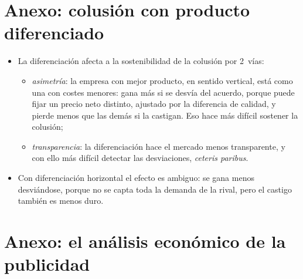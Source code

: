 \documentclass[11pt]{article}
\begin{document}
\section{Anexo: colusión con producto diferenciado}\label{anexo:colusion}

\begin{itemize}
\item La diferenciación afecta a la sostenibilidad de la colusión  por 2~vías\nocite{IvaldiEtAl2003Tacit}:
  \begin{itemize}
  \item \emph{asimetría}: la empresa con mejor producto, en sentido vertical, está como una con costes menores: gana más si se desvía del acuerdo, porque puede fijar un precio neto distinto, ajustado por la diferencia de calidad, y pierde menos que las demás si la castigan. Eso hace más difícil sostener la colusión;
  \item \emph{transparencia}: la diferenciación hace el mercado menos transparente, y con ello más difícil detectar las desviaciones, \emph{ceteris paribus}.
  \end{itemize}
\item Con diferenciación horizontal el efecto es ambiguo: se gana menos desviándose, porque no se capta toda la demanda de la rival, pero el castigo también es menos duro\nocite{Ross1992Cartel}.
\end{itemize}

\section{Anexo: el análisis económico de la publicidad}\label{anexo:publicidad}
\end{document}

